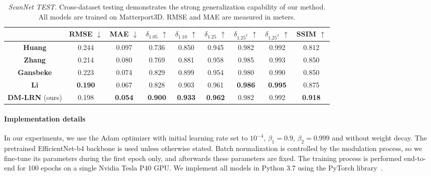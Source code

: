 \documentclass[final]{cvpr}
\begin{document}
    \begin{table*}[ht]
    \setlength{\tabcolsep}{9pt}
    \renewcommand{\arraystretch}{1.0}
    \centering
	\begin{tabular}{|c|c|c|c|c|c|c|c|c|}
	    \hline
	    & RMSE $\downarrow$ & MAE $\downarrow$ & $\delta_{1.05}$ $\uparrow$ & $\delta_{1.10}$ $\uparrow$ & $\delta_{1.25}$ $\uparrow$ & $\delta_{1.25^2}$ $\uparrow$ & $\delta_{1.25^3}$ $\uparrow$ & SSIM $\uparrow$ \\
		\hline
		\hline
		\textbf{Huang \etal \cite{Huang_2019}} & 0.244 & 0.097 & 0.736 & 0.850 & 0.945 & 0.982 & 0.992 & 0.812 \\
		\textbf{Zhang \etal \cite{DBLP:journals/corr/abs-1803-09326}} & 0.214 & 0.080 & 0.769 & 0.881 & 0.958 & 0.985 & 0.993 & 0.850 \\
		\textbf{Gansbeke} \etal \cite{wvangansbeke_depth_2019} & 0.223 & 0.074 & 0.829 & 0.899 & 0.954 & 0.980 & 0.990 & 0.850 \\
		\textbf{Li} \etal \cite{msg_chn} & \textbf{0.190} & 0.067 & 0.828 & 0.903 & 0.961 & \textbf{0.986} & \textbf{0.995} & 0.875 \\
		\hline
		\textbf{DM-LRN} (ours) & 0.198 & \textbf{0.054} & \textbf{0.900} & \textbf{0.933} & \textbf{0.962} & 0.982 & 0.992 & \textbf{0.918}\\
		\hline
	\end{tabular}
	\vspace{0.1cm}
	\caption{\emph{ScanNet TEST}. Cross-dataset testing demonstrates the strong generalization capability of our method. All models are trained on Matterport3D. RMSE and MAE are measured in meters.}
	\label{tab:scannet_test}
    \end{table*}

    \paragraph{Implementation details}
    In our experiments, we use the Adam \cite{adam} optimizer with initial learning rate set to $10^{-4}$, $\beta_1 = 0.9$, $\beta_2 = 0.999$ and without weight decay. The pretrained EfficientNet-b4 \cite{EffitientNet} backbone is used unless otherwise stated. Batch normalization is controlled by the modulation process, so we fine-tune its parameters during the first epoch only, and afterwards these parameters are fixed. The training process is performed end-to-end for 100 epochs on a single Nvidia Tesla P40 GPU. We implement all models in Python 3.7 using the PyTorch library~\cite{NEURIPS2019_9015}.
\end{document}
